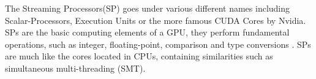 The Streaming Processors(SP) goes under various different names including Scalar-Processors, Execution Units or the more famous CUDA Cores by Nvidia.
SPs are the basic computing elements of a GPU, they perform fundamental operations, such as integer, floating-point, comparison and type conversions \cite{Li2016}.
SPs are much like the cores located in CPUs, containing similarities such as simultaneous multi-threading (SMT).



